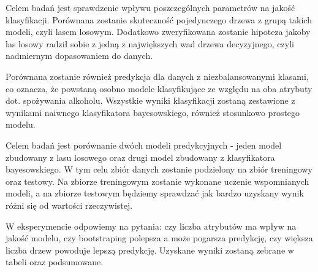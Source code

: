 Celem badań jest sprawdzenie wpływu poszczególnych parametrów na  jakość klasyfikacji. Porównana zostanie skuteczność pojedynczego drzewa z grupą takich modeli, czyli lasem losowym. Dodatkowo zweryfikowana zostanie hipoteza jakoby las losowy radził sobie z jedną z największych wad drzewa decyzyjnego, czyli nadmiernym dopasowaniem do danych.

Porównana zostanie również predykcja dla danych z niezbalansowanymi klasami, co oznacza, że powstaną osobno modele klasyfikujące ze względu na oba atrybuty dot. spożywania alkoholu. Wszystkie wyniki klasyfikacji zostaną zestawione z wynikami naiwnego klasyfikatora bayesowskiego, również stosunkowo prostego modelu.

Celem badań jest porównanie dwóch modeli predykcyjnych - jeden model zbudowany z lasu losowego oraz drugi model zbudowany z klasyfikatora bayesowskiego. W tym celu zbiór danych zostanie podzielony na zbiór treningowy oraz testowy. Na zbiorze treningowym zostanie wykonane uczenie wspomnianych modeli, a na zbiorze testowym będziemy sprawdzać jak bardzo uzyskany wynik różni się od wartości rzeczywistej.

W eksperymencie odpowiemy na pytania: czy liczba atrybutów ma wpływ na jakość modelu, czy bootstraping polepsza a może pogarsza predykcję, czy większa liczba drzew powoduje lepszą predykcję. Uzyskane wyniki zostaną zebrane w tabeli oraz podsumowane.